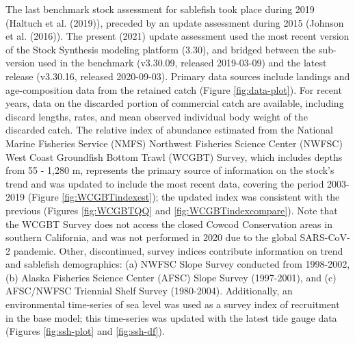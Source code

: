 \documentclass[11pt,
  english,
  a4paper,
]{article}
\begin{document}
The last benchmark stock assessment for sablefish took place during 2019 ({Haltuch et al. (2019)\leavevmode\tagmcend\tagstructend}), preceded by an update assessment during 2015 ({Johnson et al. (2016)\leavevmode\tagmcend\tagstructend}). The present (2021) update assessment used the most recent version of the Stock Synthesis modeling platform (3.30), and bridged between the sub-version used in the benchmark (v3.30.09, released 2019-03-09) and the latest release (v3.30.16, released 2020-09-03). Primary data sources include landings and age-composition data from the retained catch (Figure \ref{fig:data-plot}). For recent years, data on the discarded portion of commercial catch are available, including discard lengths, rates, and mean observed individual body weight of the discarded catch. The relative index of abundance estimated from the National Marine Fisheries Service (NMFS) Northwest Fisheries Science Center (NWFSC) West Coast Groundfish Bottom Trawl (WCGBT) Survey, which includes depths from 55 - 1,280 m, represents the primary source of information on the stock's trend and was updated to include the most recent data, covering the period 2003-2019 (Figure \ref{fig:WCGBTindexest}); the updated index was consistent with the previous (Figures \ref{fig:WCGBTQQ} and \ref{fig:WCGBTindexcompare}). Note that the WCGBT Survey does not access the closed Cowcod Conservation areas in southern California, and was not performed in 2020 due to the global SARS-CoV-2 pandemic. Other, discontinued, survey indices contribute information on trend and sablefish demographics: (a) NWFSC Slope Survey conducted from 1998-2002, (b) Alaska Fisheries Science Center (AFSC) Slope Survey (1997-2001), and (c) AFSC/NWFSC Triennial Shelf Survey (1980-2004). Additionally, an environmental time-series of sea level was used as a survey index of recruitment in the base model; this time-series was updated with the latest tide gauge data (Figures \ref{fig:ssh-plot} and \ref{fig:ssh-df}).

\leavevmode\tagmcend\tagstructend\par

\end{document}
